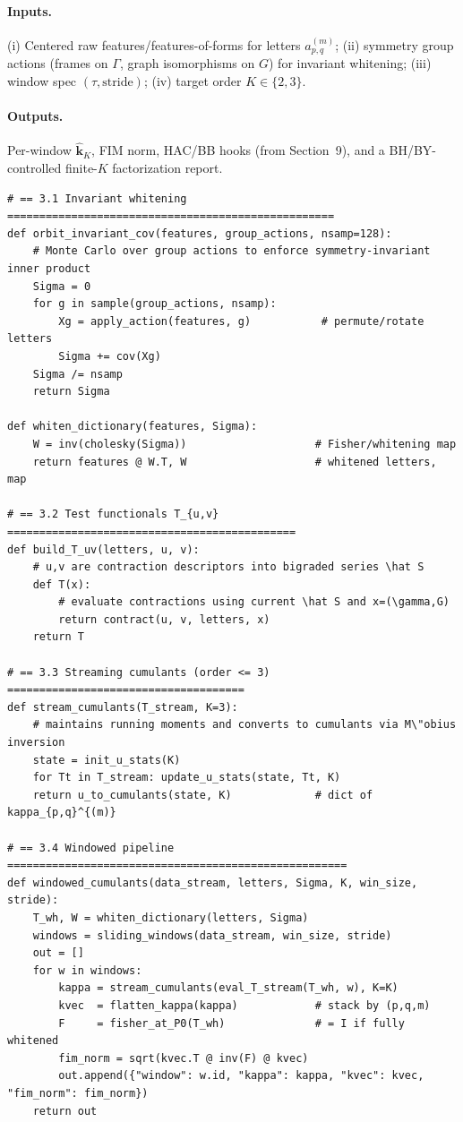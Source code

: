 \paragraph{Inputs.}
(i) Centered raw features/features-of-forms for letters $a^{(m)}_{p,q}$;  
(ii) symmetry group actions (frames on $\Gamma$, graph isomorphisms on $G$) for invariant whitening;  
(iii) window spec $(\tau,\text{stride})$; (iv) target order $K\in\{2,3\}$.

\paragraph{Outputs.}
Per-window $\widehat{\mathbf k}_K$, FIM norm, HAC/BB hooks (from Section~9), and a BH/BY-controlled finite-$K$ factorization report.

\begin{lstlisting}
# == 3.1 Invariant whitening ===================================================
def orbit_invariant_cov(features, group_actions, nsamp=128):
    # Monte Carlo over group actions to enforce symmetry-invariant inner product
    Sigma = 0
    for g in sample(group_actions, nsamp):
        Xg = apply_action(features, g)           # permute/rotate letters
        Sigma += cov(Xg)
    Sigma /= nsamp
    return Sigma

def whiten_dictionary(features, Sigma):
    W = inv(cholesky(Sigma))                    # Fisher/whitening map
    return features @ W.T, W                    # whitened letters, map

# == 3.2 Test functionals T_{u,v} =============================================
def build_T_uv(letters, u, v):
    # u,v are contraction descriptors into bigraded series \hat S
    def T(x): 
        # evaluate contractions using current \hat S and x=(\gamma,G)
        return contract(u, v, letters, x)
    return T

# == 3.3 Streaming cumulants (order <= 3) =====================================
def stream_cumulants(T_stream, K=3):
    # maintains running moments and converts to cumulants via M\"obius inversion
    state = init_u_stats(K)
    for Tt in T_stream: update_u_stats(state, Tt, K)
    return u_to_cumulants(state, K)             # dict of kappa_{p,q}^{(m)}

# == 3.4 Windowed pipeline =====================================================
def windowed_cumulants(data_stream, letters, Sigma, K, win_size, stride):
    T_wh, W = whiten_dictionary(letters, Sigma)
    windows = sliding_windows(data_stream, win_size, stride)
    out = []
    for w in windows:
        kappa = stream_cumulants(eval_T_stream(T_wh, w), K=K)
        kvec  = flatten_kappa(kappa)            # stack by (p,q,m)
        F     = fisher_at_P0(T_wh)              # = I if fully whitened
        fim_norm = sqrt(kvec.T @ inv(F) @ kvec)
        out.append({"window": w.id, "kappa": kappa, "kvec": kvec, "fim_norm": fim_norm})
    return out


\end{lstlisting}
